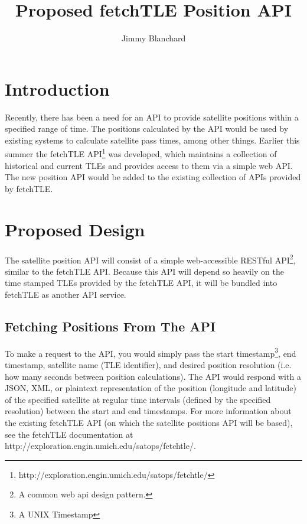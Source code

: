 \documentclass{mxl-note}
\begin{document}
\title{Proposed fetchTLE Position API}
\author{Jimmy Blanchard}
\setcounter{secnumdepth}{5}

\maketitle
\tableofcontents
\newpage 

\section{Introduction}
Recently, there has been a need for an API to provide satellite positions within a specified range of time. The positions calculated by the API would be used by existing systems to calculate satellite pass times, among other things. Earlier this summer the fetchTLE API\footnote{http://exploration.engin.umich.edu/satops/fetchtle/} was developed, which maintains a collection of historical and current TLEs and provides access to them via a simple web API. The new position API would be added to the existing collection of APIs provided by fetchTLE.

\section{Proposed Design}
The satellite position API will consist of a simple web-accessible RESTful API\footnote{A common web api design pattern.}, similar to the fetchTLE API. Because this API will depend so heavily on the time stamped TLEs provided by the fetchTLE API, it will be bundled into fetchTLE as another API service.

\subsection{Fetching Positions From The API}
To make a request to the API, you would simply pass the start timestamp\footnote{A UNIX Timestamp}, end timestamp, satellite name (TLE identifier), and desired position resolution (i.e. how many seconds between position calculations). The API would respond with a JSON, XML, or plaintext representation of the position (longitude and latitude) of the specified satellite at regular time intervals (defined by the specified resolution) between the start and end timestamps. For more information about the existing fetchTLE API (on which the satellite positions API will be based), see the fetchTLE documentation at http://exploration.engin.umich.edu/satops/fetchtle/.
\end{document}
